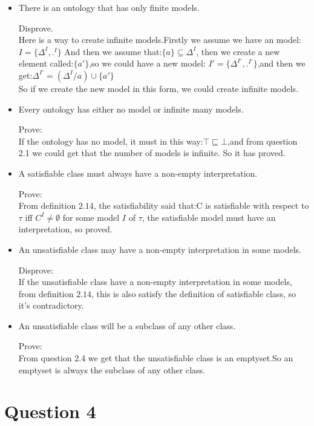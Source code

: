 \documentclass{article}
\begin{document}
	\begin{itemize}
		\item There is an ontology that has only finite models.
		
		Disprove.\\
		Here is a way to create infinite models.Firstly we assume we have an model:$I = \{\Delta^I, .^I\}$
		And then we assume that:$\{a\} \subseteq \Delta^I$, then we create a new element called:$\{a'\}$,so we could have a new model:
		$I' = \{\Delta^{I'}, .^{I'}\}$,and then we get:$\Delta^{I'} = (\Delta^{I} / a) \cup \{a'\}$\\
		So if we create the new model in this form, we could create infinite models.

		\item Every ontology has either no model or infinite many models.
		
		Prove:\\
		If the ontology has no model, it must in this way:$\top \sqsubseteq \bot$,and from question 2.1 we could get that the number of models is infinite.
		So it has proved.

		\item A satisfiable class must always have a non-empty interpretation.
		
		Prove:\\
		From definition $2.14$, the satisfiability said that:C is satisfiable with respect to $\tau$ iff $C^I \neq \emptyset$ for some model $I$ of $\tau$,
		the satisfiable model must have an interpretation, so proved. 
		
		\item An unsatisfiable class may have a non-empty interpretation in some models.
		
		Disprove:\\
		If the unsatisfiable class have a non-empty interpretation in some models, from definition $2.14$, this is also satisfy the definition of 
		satisfiable class, so it's contradictory.\\

		\item An unsatisfiable class will be a subclass of any other class.
	
		Prove:\\
		From question 2.4 we get that the unsatisfiable class is an emptyset.So an emptyset is always the subclass of any other class.
	
	\end{itemize}


	\section{Question 4}
\end{document}
